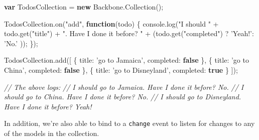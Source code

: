 \documentclass[9pt]{book}
\newenvironment{Shaded}{}{}
\newcommand{\KeywordTok}[1]{\textcolor[rgb]{0.00,0.44,0.13}{\textbf{{#1}}}}
\newcommand{\DataTypeTok}[1]{\textcolor[rgb]{0.56,0.13,0.00}{{#1}}}
\newcommand{\StringTok}[1]{\textcolor[rgb]{0.25,0.44,0.63}{{#1}}}
\newcommand{\CommentTok}[1]{\textcolor[rgb]{0.38,0.63,0.69}{\textit{{#1}}}}
\newcommand{\OtherTok}[1]{\textcolor[rgb]{0.00,0.44,0.13}{{#1}}}
\newcommand{\FunctionTok}[1]{\textcolor[rgb]{0.02,0.16,0.49}{{#1}}}
\newcommand{\NormalTok}[1]{{#1}}
\begin{document}
\begin{Shaded}
\begin{Highlighting}[]
\KeywordTok{var} \NormalTok{TodosCollection = }\KeywordTok{new} \OtherTok{Backbone}\NormalTok{.}\FunctionTok{Collection}\NormalTok{();}

\OtherTok{TodosCollection}\NormalTok{.}\FunctionTok{on}\NormalTok{(}\StringTok{"add"}\NormalTok{, }\KeywordTok{function}\NormalTok{(todo) \{}
  \OtherTok{console}\NormalTok{.}\FunctionTok{log}\NormalTok{(}\StringTok{"I should "} \NormalTok{+ }\OtherTok{todo}\NormalTok{.}\FunctionTok{get}\NormalTok{(}\StringTok{"title"}\NormalTok{) + }\StringTok{". Have I done it before? "}  \NormalTok{+ (}\OtherTok{todo}\NormalTok{.}\FunctionTok{get}\NormalTok{(}\StringTok{"completed"}\NormalTok{) ? }\StringTok{'Yeah!'}\NormalTok{: }\StringTok{'No.'} \NormalTok{));}
\NormalTok{\});}

\OtherTok{TodosCollection}\NormalTok{.}\FunctionTok{add}\NormalTok{([}
  \NormalTok{\{ }\DataTypeTok{title}\NormalTok{: }\StringTok{'go to Jamaica'}\NormalTok{, }\DataTypeTok{completed}\NormalTok{: }\KeywordTok{false} \NormalTok{\},}
  \NormalTok{\{ }\DataTypeTok{title}\NormalTok{: }\StringTok{'go to China'}\NormalTok{, }\DataTypeTok{completed}\NormalTok{: }\KeywordTok{false} \NormalTok{\},}
  \NormalTok{\{ }\DataTypeTok{title}\NormalTok{: }\StringTok{'go to Disneyland'}\NormalTok{, }\DataTypeTok{completed}\NormalTok{: }\KeywordTok{true} \NormalTok{\}}
\NormalTok{]);}

\CommentTok{// The above logs:}
\CommentTok{// I should go to Jamaica. Have I done it before? No.}
\CommentTok{// I should go to China. Have I done it before? No.}
\CommentTok{// I should go to Disneyland. Have I done it before? Yeah!}
\end{Highlighting}
\end{Shaded}

In addition, we're also able to bind to a \texttt{change} event to
listen for changes to any of the models in the collection.
\end{document}
